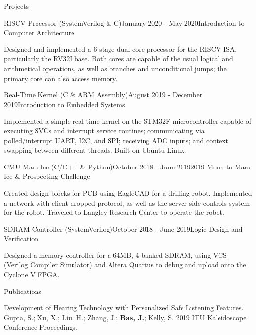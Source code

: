 \documentclass{resume} %
\begin{document}
\begin{Section}{Projects}
\begin{Subsection}{RISCV Processor (SystemVerilog \& C)}{January 2020 - May 2020}{Introduction to Computer Architecture}
\item Designed and implemented a 6-stage dual-core processor for the RISCV ISA, particularly the RV32I base. Both cores are capable of the usual logical and arithmetical operations, as well as branches and unconditional jumps; the primary core can also access memory.
\end{Subsection}

\begin{Subsection}{Real-Time Kernel (C \& ARM Assembly)}{August 2019 - December 2019}{Introduction to Embedded Systems}
\item Implemented a simple real-time kernel on the STM32F microcontroller capable of executing SVCs and interrupt service routines; communicating via polled/interrupt UART, I2C, and SPI; receiving ADC inputs; and context swapping between different threads. Built on Ubuntu Linux.
\end{Subsection}

\begin{Subsection}{CMU Mars Ice (C/C++ \& Python)}{October 2018 - June 2019}{2019 Moon to Mars Ice \& Prospecting Challenge}
\item Created design blocks for PCB using EagleCAD for a drilling robot. Implemented a network with client dropped protocol, as well as the server-side controls system for the robot. Traveled to Langley Research Center to operate the robot.
\end{Subsection}

\begin{Subsection}{SDRAM Controller (SystemVerilog)}{October 2018 - June 2019}{Logic Design and Verification}
\item Designed a memory controller for a 64MB, 4-banked SDRAM, using VCS (Verilog Compiler Simulator) and Altera Quartus to debug and upload onto the Cyclone V FPGA.
\end{Subsection}

\end{Section}

\begin{Section}{Publications}
\item Development of Hearing Technology with Personalized Safe Listening Features. Gupta, S.; Xu, X.; Liu, H.; Zhang, J.; {\bf Bas, J.}; Kelly, S. 2019 ITU Kaleidoscope Conference Proceedings. 
\end{Section}
\end{document}
